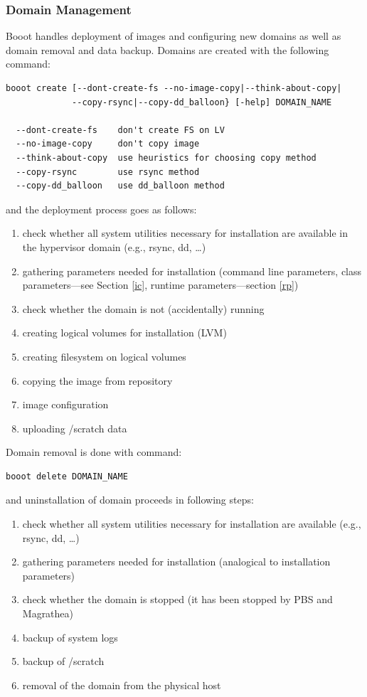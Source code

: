 \documentclass[a4paper]{article}
\begin{document}
\subsubsection{Domain Management}

Booot handles deployment of images and configuring new domains as well as
domain removal and data backup. Domains are created with the following command:

\begin{verbatim}
booot create [--dont-create-fs --no-image-copy|--think-about-copy|
             --copy-rsync|--copy-dd_balloon} [-help] DOMAIN_NAME

  --dont-create-fs    don't create FS on LV
  --no-image-copy     don't copy image
  --think-about-copy  use heuristics for choosing copy method
  --copy-rsync        use rsync method
  --copy-dd_balloon   use dd_balloon method
\end{verbatim}
and the deployment process goes as follows:

\begin{enumerate}
\item check whether all system utilities necessary for installation are
available in the hypervisor domain (e.g., rsync, dd, \dots)
\item gathering parameters needed for installation (command line
parameters, class parameters---see Section \ref{ic}, runtime
parameters---section \ref{rp})
\item check whether the domain is not (accidentally) running
\item creating logical volumes for installation (LVM)
\item creating filesystem on logical volumes
\item copying the image from repository
\item image configuration
\item uploading /scratch data
\end{enumerate}

\bigskip

Domain removal is done with command:
\begin{verbatim}
booot delete DOMAIN_NAME
\end{verbatim}
and uninstallation of domain proceeds in following steps:
\begin{enumerate}
\item check whether all system utilities necessary for installation are
available (e.g., rsync, dd, \dots)
\item gathering parameters needed for installation (analogical to
installation parameters)
\item check whether the domain is stopped (it has been stopped by
PBS and Magrathea)
\item backup of system logs
\item backup of /scratch
\item removal of the domain from the physical host
\end{enumerate}
\end{document}
